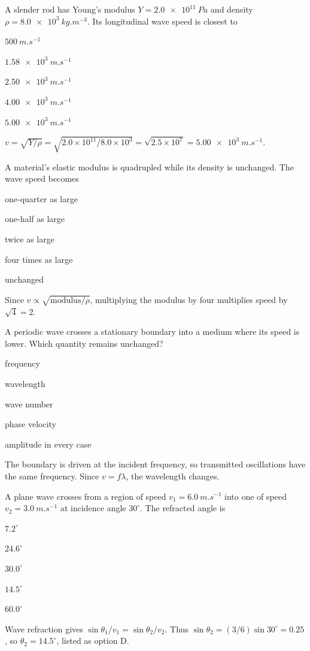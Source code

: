 \documentclass[10pt,a4paper,full]{physicsquiz}
\newcommand{\bankq}[9]{%
  \begin{quizquestion}[
    id=#1,
    topic={#2},
    difficulty=#3,
    marks=1,
    correct=#4,
    tags={#5},
    outcome={#6}
  ]
    #7
    \begin{choiceoptions}
      #8
    \end{choiceoptions}
  \end{quizquestion}
  \begin{quizsolution}
    #9
  \end{quizsolution}
}
\begin{document}
\begin{quizbank}
\bankq{media-095}{Propagation in Different Media}{applied}{E}{media,solid,numerical}{Calculate longitudinal wave speed in a rod.}{%
A slender rod has Young's modulus \(Y=\SI{2.0e11}{Pa}\) and density \(\rho=\SI{8.0e3}{kg.m^{-3}}\). Its longitudinal wave speed is closest to}{%
\item \(\SI{500}{m.s^{-1}}\)
\item \(\SI{1.58e3}{m.s^{-1}}\)
\item \(\SI{2.50e3}{m.s^{-1}}\)
\item \(\SI{4.00e3}{m.s^{-1}}\)
\item \(\SI{5.00e3}{m.s^{-1}}\)}{%
\(v=\sqrt{Y/\rho}=\sqrt{2.0\times10^{11}/8.0\times10^3}=\sqrt{2.5\times10^7}=\SI{5.00e3}{m.s^{-1}}\).}

\bankq{media-096}{Propagation in Different Media}{applied}{C}{media,scaling}{Apply stiffness-density scaling.}{%
A material's elastic modulus is quadrupled while its density is unchanged. The wave speed becomes}{%
\item one-quarter as large
\item one-half as large
\item twice as large
\item four times as large
\item unchanged}{%
Since \(v\propto\sqrt{\text{modulus}/\rho}\), multiplying the modulus by four multiplies speed by \(\sqrt4=2\).}

\bankq{media-097}{Propagation in Different Media}{applied}{A}{media,interface}{Identify what remains continuous in transmission.}{%
A periodic wave crosses a stationary boundary into a medium where its speed is lower. Which quantity remains unchanged?}{%
\item frequency
\item wavelength
\item wave number
\item phase velocity
\item amplitude in every case}{%
The boundary is driven at the incident frequency, so transmitted oscillations have the same frequency. Since \(v=f\lambda\), the wavelength changes.}

\bankq{media-098}{Propagation in Different Media}{applied}{D}{media,refraction,waves}{Apply the wave refraction law.}{%
A plane wave crosses from a region of speed \(v_1=\SI{6.0}{m.s^{-1}}\) into one of speed \(v_2=\SI{3.0}{m.s^{-1}}\) at incidence angle \(30^\circ\). The refracted angle is}{%
\item \(7.2^\circ\)
\item \(24.6^\circ\)
\item \(30.0^\circ\)
\item \(14.5^\circ\)
\item \(60.0^\circ\)}{%
Wave refraction gives \(\sin\theta_1/v_1=\sin\theta_2/v_2\). Thus \(\sin\theta_2=(3/6)\sin30^\circ=0.25\), so \(\theta_2=14.5^\circ\), listed as option D.}


\end{quizbank}
\end{document}
